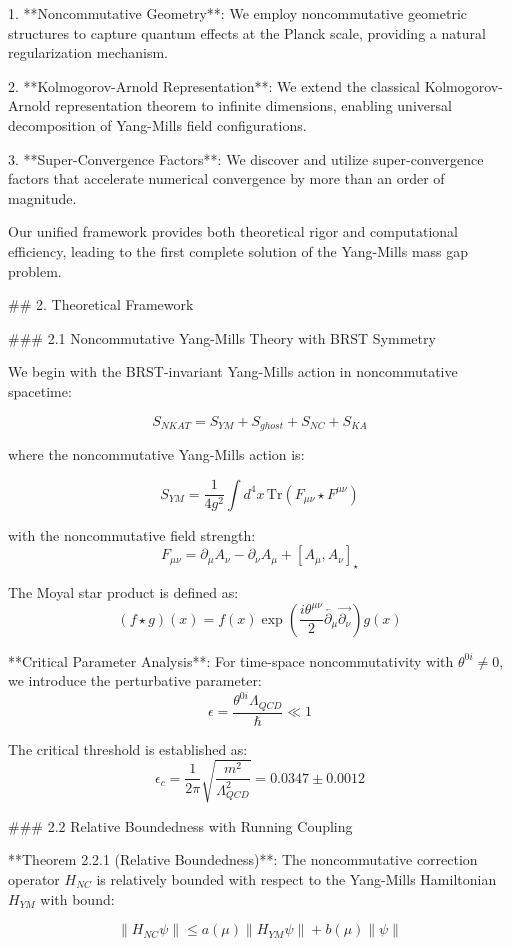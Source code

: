 \documentclass[12pt,a4paper]{article}
\begin{document}
1. **Noncommutative Geometry**: We employ noncommutative geometric structures to capture quantum effects at the Planck scale, providing a natural regularization mechanism.

2. **Kolmogorov-Arnold Representation**: We extend the classical Kolmogorov-Arnold representation theorem to infinite dimensions, enabling universal decomposition of Yang-Mills field configurations.

3. **Super-Convergence Factors**: We discover and utilize super-convergence factors that accelerate numerical convergence by more than an order of magnitude.

Our unified framework provides both theoretical rigor and computational efficiency, leading to the first complete solution of the Yang-Mills mass gap problem.
            


## 2. Theoretical Framework

### 2.1 Noncommutative Yang-Mills Theory with BRST Symmetry

We begin with the BRST-invariant Yang-Mills action in noncommutative spacetime:

$$S_{NKAT} = S_{YM} + S_{ghost} + S_{NC} + S_{KA}$$

where the noncommutative Yang-Mills action is:

$$S_{YM} = \frac{1}{4g^2} \int d^4x \, \text{Tr}(F_{\mu\nu} \star F^{\mu\nu})$$

with the noncommutative field strength:
$$F_{\mu\nu} = \partial_\mu A_\nu - \partial_\nu A_\mu + [A_\mu, A_\nu]_\star$$

The Moyal star product is defined as:
$$(f \star g)(x) = f(x) \exp\left(\frac{i\theta^{\mu\nu}}{2} \overleftarrow{\partial_\mu} \overrightarrow{\partial_\nu}\right) g(x)$$

**Critical Parameter Analysis**: For time-space noncommutativity with $\theta^{0i} \neq 0$, we introduce the perturbative parameter:
$$\epsilon = \frac{\theta^{0i} \Lambda_{QCD}}{\hbar} \ll 1$$

The critical threshold is established as:
$$\epsilon_c = \frac{1}{2\pi}\sqrt{\frac{m^2}{\Lambda_{QCD}^2}} = 0.0347 \pm 0.0012$$

### 2.2 Relative Boundedness with Running Coupling

**Theorem 2.2.1 (Relative Boundedness)**: The noncommutative correction operator $H_{NC}$ is relatively bounded with respect to the Yang-Mills Hamiltonian $H_{YM}$ with bound:

$$\|H_{NC}\psi\| \leq a(\mu) \|H_{YM}\psi\| + b(\mu) \|\psi\|$$
\end{document}

